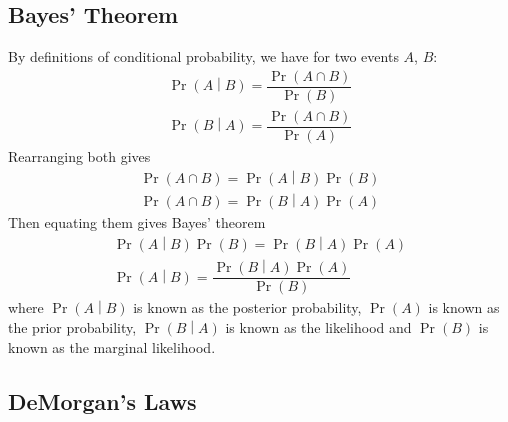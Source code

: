 \documentclass[11pt]{report} %
\begin{document}
\subsection{Bayes' Theorem}

By definitions of conditional probability, we have for two events $A$, $B$:
\begin{gather}
\operatorname{Pr}\left(A\middle|B\right) = \dfrac{\operatorname{Pr}\left(A\cap B\right)}{\operatorname{Pr}\left(B\right)} \\
\operatorname{Pr}\left(B\middle|A\right) = \dfrac{\operatorname{Pr}\left(A\cap B\right)}{\operatorname{Pr}\left(A\right)}
\end{gather}
Rearranging both gives
\begin{gather}
\operatorname{Pr}\left(A\cap B\right) = \operatorname{Pr}\left(A\middle|B\right)\operatorname{Pr}\left(B\right) \\
\operatorname{Pr}\left(A\cap B\right) = \operatorname{Pr}\left(B\middle|A\right)\operatorname{Pr}\left(A\right)
\end{gather}
Then equating them gives Bayes' theorem
\begin{gather}
\operatorname{Pr}\left(A\middle|B\right)\operatorname{Pr}\left(B\right) = \operatorname{Pr}\left(B\middle|A\right)\operatorname{Pr}\left(A\right) \\
\operatorname{Pr}\left(A\middle|B\right) = \dfrac{\operatorname{Pr}\left(B\middle|A\right)\operatorname{Pr}\left(A\right)}{\operatorname{Pr}\left(B\right)}
\end{gather}
where $\operatorname{Pr}\left(A\middle|B\right)$ is known as the posterior probability, $\operatorname{Pr}\left(A\right)$ is known as the prior probability, $\operatorname{Pr}\left(B\middle|A\right)$ is known as the likelihood and $\operatorname{Pr}\left(B\right)$ is known as the marginal likelihood.

\subsection{DeMorgan's Laws}
\end{document}
